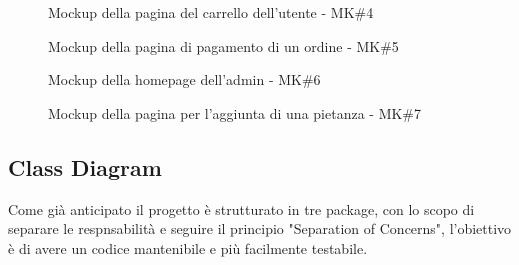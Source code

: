 \documentclass{article}
\begin{document}
\setlength{\fboxsep}{0pt}
            \begin{figure}[H]
                \centering
                \caption{Mockup della pagina del carrello dell'utente - MK\#4}
                \label{fig:mk.4}
            \end{figure}

\setlength{\fboxsep}{0pt}
            \begin{figure}[H]
                \centering
                \caption{Mockup della pagina di pagamento di un ordine - MK\#5}
                \label{fig:mk.5}
            \end{figure}            

\setlength{\fboxsep}{0pt}
            \begin{figure}[H]
                \centering
                \caption{Mockup della homepage dell'admin - MK\#6}
                \label{fig:mk.6}
            \end{figure}        

\setlength{\fboxsep}{0pt}
            \begin{figure}[H]
                \centering
                \caption{Mockup della pagina per l'aggiunta di una pietanza - MK\#7}
                \label{fig:mk.7}
            \end{figure}       

            
\subsection{Class Diagram}
Come già anticipato il progetto è strutturato in tre package, con lo scopo di separare le respnsabilità e seguire il principio "Separation of Concerns", l'obiettivo è di avere un codice mantenibile e più facilmente testabile.
\end{document}
